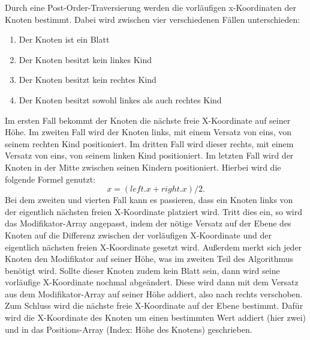 Durch eine Post-Order-Traversierung werden die vorläufigen x-Koordinaten der Knoten bestimmt.
Dabei wird zwischen vier verschiedenen Fällen unterschieden:
\begin{enumerate}
	\item Der Knoten ist ein Blatt
	\item Der Knoten besitzt kein linkes Kind
	\item Der Knoten besitzt kein rechtes Kind
	\item Der Knoten besitzt sowohl linkes als auch rechtes Kind
\end{enumerate}

Im ersten Fall bekommt der Knoten die nächste freie X-Koordinate auf seiner Höhe. 
Im zweiten Fall wird der Knoten links, mit einem Versatz von eins, von seinem rechten Kind positioniert.
Im dritten Fall wird dieser rechts, mit einem Versatz von eins, von seinem linken Kind positioniert. Im letzten Fall wird der Knoten
in der Mitte zwischen seinen Kindern positioniert. Hierbei wird die folgende Formel genutzt: $$x = (left.x + right.x) / 2.$$
Bei dem zweiten und vierten Fall kann es passieren, dass ein Knoten links von der eigentlich nächsten freien X-Koordinate platziert wird.
Tritt dies ein, so wird das Modifikator-Array angepasst, indem der nötige Versatz auf der Ebene des Knoten auf die Differenz zwischen
der vorläufigen X-Koordinate und der eigentlich nächsten freien X-Koordinate gesetzt wird. Außerdem merkt sich jeder Knoten den Modifikator
auf seiner Höhe, was im zweiten Teil des Algorithmus benötigt wird. Sollte dieser Knoten zudem kein Blatt sein, dann
wird seine vorläufige X-Koordinate nochmal abgeändert. Diese wird dann mit dem Versatz aus dem Modifikator-Array auf seiner Höhe addiert, 
also nach rechts verschoben. Zum Schluss wird die nächste freie X-Koordinate auf der Ebene bestimmt. Dafür wird die X-Koordinate 
des Knoten um einen  bestimmten Wert addiert (hier zwei) und in das Positions-Array (Index: Höhe des Knotens) geschrieben.\\

